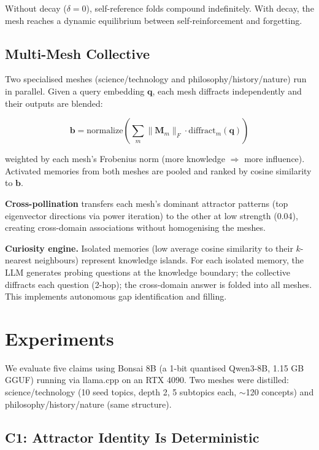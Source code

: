 \documentclass[11pt]{article}
\begin{document}
Without decay ($\delta=0$), self-reference folds compound indefinitely. With
decay, the mesh reaches a dynamic equilibrium between self-reinforcement and
forgetting.

\subsection{Multi-Mesh Collective}

Two specialised meshes (science/technology and philosophy/history/nature) run
in parallel. Given a query embedding $\mathbf{q}$, each mesh diffracts
independently and their outputs are blended:

\begin{equation}
  \mathbf{b} = \text{normalize}\!\left(\sum_m \|\mathbf{M}_m\|_F \cdot \text{diffract}_m(\mathbf{q})\right)
\end{equation}

weighted by each mesh's Frobenius norm (more knowledge $\Rightarrow$ more
influence). Activated memories from both meshes are pooled and ranked by cosine
similarity to $\mathbf{b}$.

\textbf{Cross-pollination} transfers each mesh's dominant attractor patterns
(top eigenvector directions via power iteration) to the other at low strength
(0.04), creating cross-domain associations without homogenising the meshes.

\textbf{Curiosity engine.} Isolated memories (low average cosine similarity to
their $k$-nearest neighbours) represent knowledge islands. For each isolated
memory, the LLM generates probing questions at the knowledge boundary; the
collective diffracts each question (2-hop); the cross-domain answer is folded
into all meshes. This implements autonomous gap identification and filling.

\section{Experiments}

We evaluate five claims using Bonsai 8B (a 1-bit quantised Qwen3-8B, 1.15 GB
GGUF) running via llama.cpp on an RTX 4090. Two meshes were distilled:
science/technology (10 seed topics, depth 2, 5 subtopics each, $\sim$120
concepts) and philosophy/history/nature (same structure).

\subsection{C1: Attractor Identity Is Deterministic}
\end{document}
